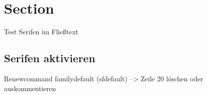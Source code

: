 \documentclass[a4paper,11pt]{scrartcl}
\begin{document}



\section{Section}
Test Serifen im Fließtext \\
\lipsum
\lipsum
\subsection{Serifen aktivieren}
Renewcommand familydefault (sfdefault) --> Zeile 20 löschen oder auskommentieren



\end{document}
